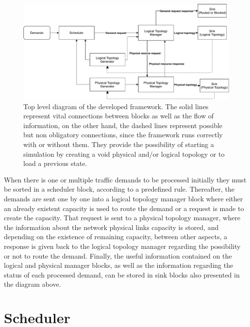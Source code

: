 \begin{figure}[H]
  \begin{center}
    \includegraphics[width=1\textwidth]{fig/logos/framework.pdf}
    \caption{Top level diagram of the developed framework. The solid lines represent vital connections between blocks as well as the flow of information, on the other hand, the dashed lines represent possible but non obligatory connections, since the framework runs correctly with or without them. They provide the possibility of starting a simulation by creating a void physical and/or logical topology or to load a previous state.}
  \end{center}
  \label{framework}
\end{figure}

When there is one or multiple traffic demands to be processed initially they must be sorted in a scheduler block, according to a predefined rule. Thereafter, the demands are sent one by one into a logical topology manager block where either an already existent capacity is used to route the demand or a request is made to create the capacity. That request is sent to a physical topology manager, where the information about the network physical links capacity is stored, and depending on the existence of remaining capacity, between other aspects, a response is given back to the logical topology manager regarding the possibility or not to route the demand. Finally, the useful information contained on the logical and physical manager blocks, as well as the information regarding the status of each processed demand, can be stored in sink blocks also presented in the diagram above.    

\section{Scheduler}
\label{scheduler}

